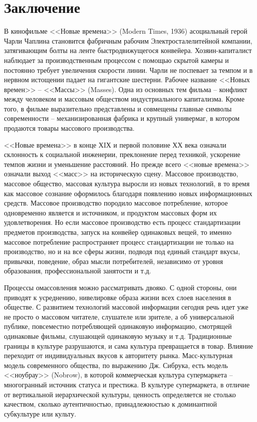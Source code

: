 \section*{Заключение}

В кинофильме <<Новые времена>> (Modern Times, 1936) асоциальный герой Чарли Чаплина становится
фабричным рабочим Электросталелитейной компании, затягивающим болты на ленте быстродвижущегося
конвейера. Хозяин-капиталист наблюдает за производственным процессом с помощью скрытой камеры и
постоянно требует увеличения скорости линии. Чарли не поспевает за темпом и в нервном истощении
падает на гигантские шестерни. Рабочее название <<Новых времен>> -- <<Массы>> (Masses).  Одна из
основных тем фильма -- конфликт между человеком и массовым обществом индустриального
капитализма. Кроме того, в фильме выразительно представлены и совмещены главные символы
современности -- механизированная фабрика и крупный универмаг, в котором продаются товары массового
производства.

<<Новые времена>> в конце ХIХ и первой половине ХХ века означали склонность к социальной инженерии,
преклонение перед техникой,  ускорение темпов жизни и уменьшение расстояний.  Но прежде всего <<новые
времена>> означали выход <<масс>> на историческую сцену. Массовое производство, массовое общество,
массовая культура выросли из новых технологий, в то время как массовое сознание оформилось благодаря
появлению новых информационных средств. Массовое производство породило массовое потребление, которое
одновременно является и источником, и продуктом массовых форм их удовлетворения.  Но если массовое
производство есть процесс стандартизации предметов производства, запуск на конвейер одинаковых
вещей, то именно массовое потребление распространяет процесс стандартизации не только на
производство, но и на все сферы жизни, подводя под единый стандарт вкусы, привычки, поведение, образ
мысли потребителей, независимо от уровня образования, профессиональной занятости и т.д.

Процессы омассовления можно рассматривать двояко. С одной стороны, они приводят к усреднению,
нивелировке образа жизни всех слоев населения в обществе. С развитием технологий массовой информации
сегодня речь идет уже не просто о массовом читателе, слушателе или зрителе, а об универсальной
публике, повсеместно потребляющей одинаковую информацию, смотрящей одинаковые фильмы, слушающей
одинаковую  музыку и т.д. Традиционные границы в культуре  разрушаются, и сама культура превращается
в товар. Влияние переходит от индивидуальных вкусов к авторитету рынка. Масс-культурная модель
современного общества, по выражению Дж. Сибрука, есть модель <<ноубрау>> (Nobrow), в которой
коммерческая культура супермаркета -- многогранный источник статуса и престижа. В культуре
супермаркета, в отличие от вертикальной иерархической культуры, ценность определяется не столько
качеством, сколько аутентичностью, принадлежностью к доминантной субкультуре или культу. \autocite{sibruk2005}

